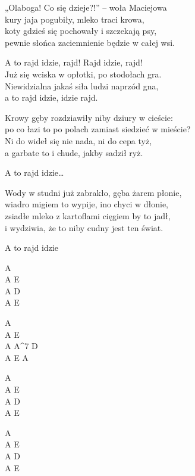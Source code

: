 \begin{text}
    „Olaboga! Co się dzieje?!” – woła Maciejowa\\
    kury jaja pogubiły, mleko traci krowa,\\
    koty gdzieś się pochowały i szczekają psy,\\
    pewnie słońca zaciemnienie będzie w całej wsi.

    \vin A to rajd idzie, rajd! Rajd idzie, rajd!\\
    \vin Już się wciska w opłotki, po stodołach gra.\\
    \vin Niewidzialna jakaś siła ludzi naprzód gna,\\
    \vin a to rajd idzie, idzie rajd.

    Krowy gęby rozdziawiły niby dziury w cieście:\\
    po co łazi to po polach zamiast siedzieć w mieście?\\
    Ni do wideł się nie nada, ni do cepa tyż,\\
    a garbate to i chude, jakby sadził ryż.

    \vin A to rajd idzie…

    Wody w studni już zabrakło, gęba żarem płonie,\\
    wiadro migiem to wypije, ino chyci w dłonie,\\
    zsiadłe mleko z kartoflami cięgiem by to jadł,\\
    i wydziwia, że to niby cudny jest ten świat.

    \vin A to rajd idzie
\end{text}
\begin{chord}
    A\\
    A E\\
    A D\\
    A E

    A\\
    A E\\
    A A^7 D\\
    A E A

    A\\
    A E\\
    A D\\
    A E\\
    \hfill\break

    A\\
    A E\\
    A D\\
    A E
\end{chord}
